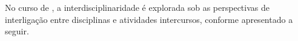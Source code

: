 No curso de \nomedocurso, a interdisciplinaridade é explorada sob as perspectivas de interligação entre disciplinas e atividades intercursos, conforme apresentado a seguir.






